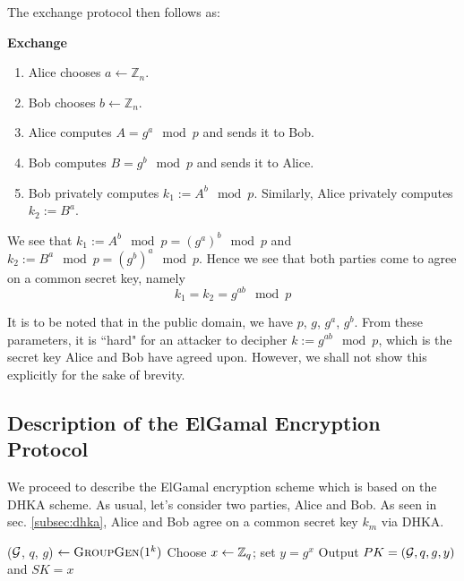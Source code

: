 The exchange protocol then follows as:

\begin{tcolorbox}
\textbf{Exchange} 
\begin{enumerate}
    \item Alice chooses \( a \leftarrow \mathbb{Z}_n \). 
    \item Bob chooses \( b \leftarrow \mathbb{Z}_n \).
    \item Alice computes \( A = g^a \mod p \) and sends it to Bob.
    \item Bob computes \( B = g^b \mod p \) and sends it to Alice.
    \item Bob privately computes \( k_1 := A^b \mod p \). Similarly, Alice privately computes \( k_2 := B^a \).
\end{enumerate}
\end{tcolorbox}

We see that \( k_1 := A^b \mod p = (g^a)^b \mod p \) and \( k_2 := B^a \mod p = (g^b)^a \mod p \). Hence we see that both parties come to agree on a common secret key, namely
\begin{equation}
    k_1 = k_2 = g^{ab} \mod p
\end{equation}

It is to be noted that in the public domain, we have \( p \), \( g \), \( g^a \), \( g^b \). 
From these parameters, it is ``hard" for an attacker to decipher \( k := g^{ab} \mod p\), which is the secret key Alice and Bob have agreed upon. 
However, we shall not show this explicitly for the sake of brevity.

\subsection{Description of the ElGamal Encryption Protocol}

We proceed to describe the ElGamal encryption scheme which is based on the DHKA scheme. As usual, let's consider two parties, Alice and Bob. 
As seen in sec. \ref{subsec:dhka}, Alice and Bob agree on a common secret key \( k_m \) via DHKA. 




\smallskip


\begin{algorithmic}
\STATE ($ \mathcal{G} $, $ q $, $ g $) $ \leftarrow \textsc{GroupGen} (1^k) $ 
\STATE Choose $ x \leftarrow \mathbb{Z}_q $; set $ y = g^x $ 
\STATE Output $ PK = ( \mathcal{G}, q, g, y) $ and $ SK = x $ 
\end{algorithmic} 

